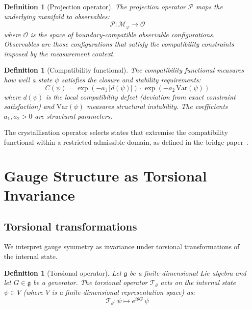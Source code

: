 \documentclass[12pt]{article}
\newtheorem{definition}[theorem]{Definition}
\newcommand{\Mcal}{\mathcal{M}}
\newcommand{\Tcal}{\mathcal{T}}
\newcommand{\Pcal}{\mathcal{P}}
\newcommand{\phig}{\varphi}
\begin{document}
\begin{definition}[Projection operator]\label{def:projection}
The projection operator $\Pcal$ maps the underlying manifold to observables:
\begin{equation}
    \Pcal : \Mcal_\phig \to \mathcal{O}
\end{equation}
where $\mathcal{O}$ is the space of boundary-compatible observable configurations. Observables are those configurations that satisfy the compatibility constraints imposed by the measurement context.
\end{definition}

\begin{definition}[Compatibility functional]\label{def:compatibility}
The compatibility functional measures how well a state $\psi$ satisfies the closure and stability requirements:
\begin{equation}\label{eq:compatibility}
    C(\psi) = \exp\!\left(-a_1\, |d(\psi)|\right) \cdot \exp\!\left(-a_2\, \mathrm{Var}(\psi)\right)
\end{equation}
where $d(\psi)$ is the local compatibility defect (deviation from exact constraint satisfaction) and $\mathrm{Var}(\psi)$ measures structural instability. The coefficients $a_1, a_2 > 0$ are structural parameters.
\end{definition}

The crystallisation operator selects states that extremise the compatibility functional within a restricted admissible domain, as defined in the bridge paper~\citep{SmartBridge}.

\section{Gauge Structure as Torsional Invariance}\label{sec:gauge}

\subsection{Torsional transformations}

We interpret gauge symmetry as invariance under torsional transformations of the internal state.

\begin{definition}[Torsional operator]\label{def:torsion}
Let $\mathfrak{g}$ be a finite-dimensional Lie algebra and let $G \in \mathfrak{g}$ be a generator. The torsional operator $\Tcal_\theta$ acts on the internal state $\psi \in V$ (where $V$ is a finite-dimensional representation space) as:
\begin{equation}\label{eq:torsion}
    \Tcal_\theta : \psi \mapsto e^{i\theta G}\, \psi
\end{equation}
\end{definition}
\end{document}
